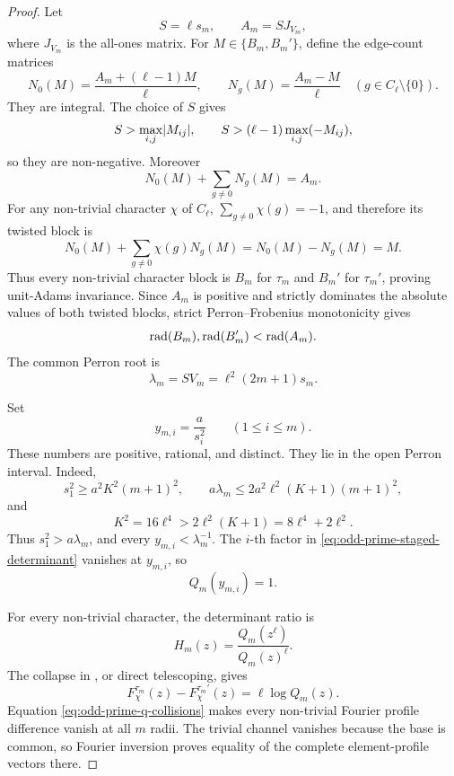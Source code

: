 \begin{proof}
Let
\begin{equation}\label{eq:odd-prime-common-base}
 S=\ell s_m,
 \qquad
 A_m=S J_{V_m},
\end{equation}
where \(J_{V_m}\) is the all-ones matrix.  For
\(M\in\{B_m,B_m'\}\), define the edge-count matrices
\begin{equation}\label{eq:odd-prime-label-counts}
 N_0(M)=\frac{A_m+(\ell-1)M}{\ell},
 \qquad
 N_g(M)=\frac{A_m-M}{\ell}\quad(g\in C_\ell\setminus\{0\}).
\end{equation}
They are integral.  The choice of \(S\) gives
\[
 S>\max_{i,j}\lvert M_{ij} \rvert,
 \qquad
 S>(\ell-1)\max_{i,j}(-M_{ij}),
\]
so they are non-negative.  Moreover
\[
 N_0(M)+\sum_{g\ne0}N_g(M)=A_m.
\]
For any non-trivial character \(\chi\) of \(C_\ell\),
\(\sum_{g\ne0}\chi(g)=-1\), and therefore its twisted block is
\[
 N_0(M)+\sum_{g\ne0}\chi(g)N_g(M)=N_0(M)-N_g(M)=M.
\]
Thus every non-trivial character block is \(B_m\) for \(\tau_m\) and
\(B_m'\) for \(\tau_m'\), proving unit-Adams invariance.  Since \(A_m\) is
positive and strictly dominates the absolute values of both twisted blocks,
strict Perron--Frobenius monotonicity gives
\[
 \operatorname{rad}(B_m),\operatorname{rad}(B_m')<\operatorname{rad}(A_m).
\]
The common Perron root is
\begin{equation}\label{eq:odd-prime-perron-root}
 \lambda_m=SV_m=\ell^2(2m+1)s_m.
\end{equation}

Set
\begin{equation}\label{eq:odd-prime-collision-radii}
 y_{m,i}=\frac{a}{s_i^2}\qquad(1\le i\le m).
\end{equation}
These numbers are positive, rational, and distinct.  They lie in the open
Perron interval.  Indeed,
\[
 s_1^2\ge a^2K^2(m+1)^2,
 \qquad
 a\lambda_m\le2a^2\ell^2(K+1)(m+1)^2,
\]
and
\[
 K^2=16\ell^4>2\ell^2(K+1)=8\ell^4+2\ell^2.
\]
Thus \(s_1^2>a\lambda_m\), and every
\(y_{m,i}<\lambda_m^{-1}\).  The \(i\)-th factor in
\eqref{eq:odd-prime-staged-determinant} vanishes at \(y_{m,i}\), so
\begin{equation}\label{eq:odd-prime-q-collisions}
 Q_m(y_{m,i})=1.
\end{equation}

For every non-trivial character, the determinant ratio is
\begin{equation}\label{eq:odd-prime-mahler-ratio}
 H_m(z)=\frac{Q_m(z^\ell)}{Q_m(z)^\ell}.
\end{equation}
The collapse in , or direct
telescoping, gives
\[
 F_\chi^{\tau_m}(z)-F_\chi^{\tau_m'}(z)
 =\ell\log Q_m(z).
\]
Equation \eqref{eq:odd-prime-q-collisions} makes every non-trivial Fourier
profile difference vanish at all \(m\) radii.  The trivial channel vanishes
because the base is common, so Fourier inversion proves equality of the
complete element-profile vectors there.


\end{proof}
